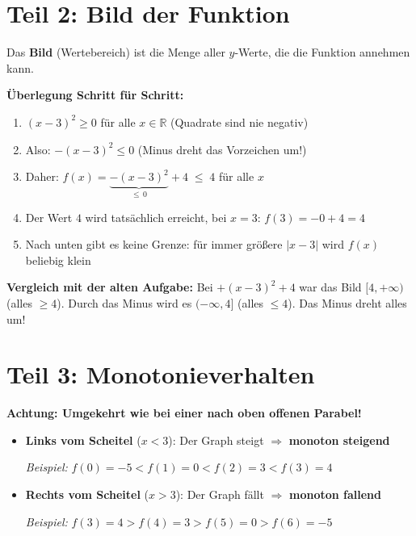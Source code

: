 \documentclass[12pt, a4paper]{article}
\begin{document}
\section*{Teil 2: Bild der Funktion}

Das \textbf{Bild} (Wertebereich) ist die Menge aller $y$-Werte, die die Funktion annehmen kann.

\textbf{Überlegung Schritt für Schritt:}

\begin{enumerate}
    \item $(x - 3)^2 \geq 0$ für alle $x \in \mathbb{R}$ \quad (Quadrate sind nie negativ)
    \item Also: $-(x-3)^2 \leq 0$ \quad (Minus dreht das Vorzeichen um!)
    \item Daher: $f(x) = \underbrace{-(x-3)^2}_{\leq\, 0} + 4 \;\leq\; 4$ \quad für alle $x$
    \item Der Wert $4$ wird tatsächlich erreicht, bei $x = 3$: \quad $f(3) = -0 + 4 = 4$ \checkmark
    \item Nach unten gibt es keine Grenze: für immer größere $|x - 3|$ wird $f(x)$ beliebig klein
\end{enumerate}

\begin{center}
\fbox{%
    \parbox{0.5\textwidth}{%
        \centering
        \textbf{Bild von $f$:} $\quad f(\mathbb{R}) = (-\infty,\, 4]$

        \vspace{0.3em}
        D.h. alle reellen Zahlen $\leq 4$.
    }%
}
\end{center}

\textbf{Vergleich mit der alten Aufgabe:} Bei $+(x-3)^2 + 4$ war das Bild $[4, +\infty)$ (alles $\geq 4$). Durch das Minus wird es $(-\infty, 4]$ (alles $\leq 4$). Das Minus dreht alles um!

\section*{Teil 3: Monotonieverhalten}

\textbf{Achtung: Umgekehrt wie bei einer nach oben offenen Parabel!}

\begin{itemize}
    \item \textbf{Links vom Scheitel} ($x < 3$): Der Graph steigt $\Rightarrow$ \textbf{monoton steigend}

    \textit{Beispiel:} $f(0) = -5 < f(1) = 0 < f(2) = 3 < f(3) = 4$ \checkmark

    \item \textbf{Rechts vom Scheitel} ($x > 3$): Der Graph fällt $\Rightarrow$ \textbf{monoton fallend}

    \textit{Beispiel:} $f(3) = 4 > f(4) = 3 > f(5) = 0 > f(6) = -5$ \checkmark
\end{itemize}
\end{document}
